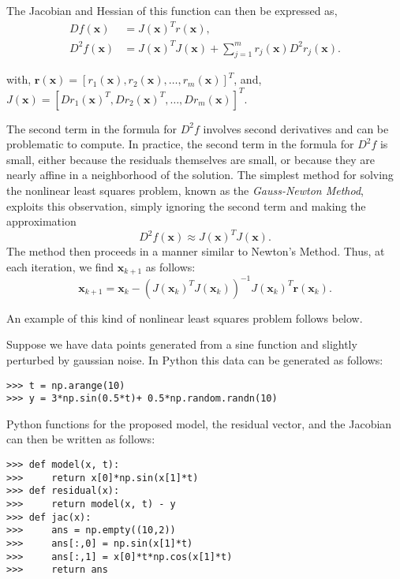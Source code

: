 The Jacobian and Hessian of this function can then be expressed as,
\begin{align*}
Df(\mathbf{x}) &= J(\mathbf{x})^T r(\mathbf{x}), \\
D^2 f(\mathbf{x}) &= J(\mathbf{x})^TJ(\mathbf{x}) + \displaystyle \sum_{j=1}^m r_j(\mathbf{x}) D^2r_j(\mathbf{x}).
\end{align*}

\noindent with, 
$\mathbf{r}(\mathbf{x}) = [r_1(\mathbf{x}), r_2(\mathbf{x}), \ldots, r_m(\mathbf{x})]^T$, and,
$J(\mathbf{x}) = [D r_1(\mathbf{x})^T, D r_2(\mathbf{x})^T, \hdots, D r_m(\mathbf{x})]^T$.


The second term in the formula for $D^2 f$ involves second derivatives and can be problematic to compute. 
In practice, the second term in the formula for $D^2 f$ is small, either because the residuals themselves are small, or because they are nearly affine in a neighborhood of the solution.
The simplest method for solving the nonlinear least squares problem, known as the \emph{Gauss-Newton Method}, exploits this observation, simply ignoring the second term and making the approximation
$$
D^2 f(\mathbf{x}) \approx J(\mathbf{x})^TJ(\mathbf{x}).
$$
The method then proceeds in a manner similar to Newton's Method.
Thus, at each iteration, we find $\mathbf{x}_{k+1}$ as follows:
\begin{equation} \label{Eq:GaussNewtonUpdate}
\mathbf{x}_{k+1} = \mathbf{x}_k-(J(\mathbf{x}_k)^TJ(\mathbf{x}_k))^{-1}J( \mathbf{x}_k)^T \mathbf{r}( \mathbf{x}_k).
\end{equation}

\noindent An example of this kind of nonlinear least squares problem follows below.

Suppose we have data points generated from a sine function and slightly perturbed by gaussian noise. 
In Python this data can be generated as follows:

\begin{lstlisting}
>>> t = np.arange(10)
>>> y = 3*np.sin(0.5*t)+ 0.5*np.random.randn(10)
\end{lstlisting}

Python functions for the proposed model, the residual vector, and the Jacobian can then be written as follows:

\begin{lstlisting}
>>> def model(x, t):
>>>     return x[0]*np.sin(x[1]*t)
>>> def residual(x):
>>>     return model(x, t) - y
>>> def jac(x):
>>>     ans = np.empty((10,2))
>>>     ans[:,0] = np.sin(x[1]*t)
>>>     ans[:,1] = x[0]*t*np.cos(x[1]*t)
>>>     return ans
\end{lstlisting}

